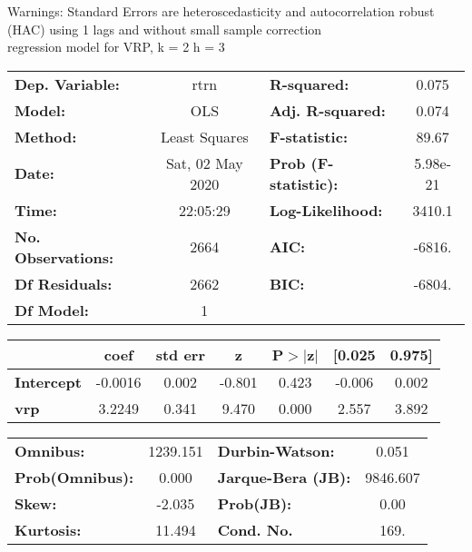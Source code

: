 Warnings: \newline
 [1] Standard Errors are heteroscedasticity and autocorrelation robust (HAC) using 1 lags and without small sample correction\\ 

regression model for VRP, k = 2 h = 3\begin{center}
\begin{tabular}{lclc}
\toprule
\textbf{Dep. Variable:}    &       rtrn       & \textbf{  R-squared:         } &     0.075   \\
\textbf{Model:}            &       OLS        & \textbf{  Adj. R-squared:    } &     0.074   \\
\textbf{Method:}           &  Least Squares   & \textbf{  F-statistic:       } &     89.67   \\
\textbf{Date:}             & Sat, 02 May 2020 & \textbf{  Prob (F-statistic):} &  5.98e-21   \\
\textbf{Time:}             &     22:05:29     & \textbf{  Log-Likelihood:    } &    3410.1   \\
\textbf{No. Observations:} &        2664      & \textbf{  AIC:               } &    -6816.   \\
\textbf{Df Residuals:}     &        2662      & \textbf{  BIC:               } &    -6804.   \\
\textbf{Df Model:}         &           1      & \textbf{                     } &             \\
\bottomrule
\end{tabular}
\begin{tabular}{lcccccc}
                   & \textbf{coef} & \textbf{std err} & \textbf{z} & \textbf{P$> |$z$|$} & \textbf{[0.025} & \textbf{0.975]}  \\
\midrule
\textbf{Intercept} &      -0.0016  &        0.002     &    -0.801  &         0.423        &       -0.006    &        0.002     \\
\textbf{vrp}       &       3.2249  &        0.341     &     9.470  &         0.000        &        2.557    &        3.892     \\
\bottomrule
\end{tabular}
\begin{tabular}{lclc}
\textbf{Omnibus:}       & 1239.151 & \textbf{  Durbin-Watson:     } &    0.051  \\
\textbf{Prob(Omnibus):} &   0.000  & \textbf{  Jarque-Bera (JB):  } & 9846.607  \\
\textbf{Skew:}          &  -2.035  & \textbf{  Prob(JB):          } &     0.00  \\
\textbf{Kurtosis:}      &  11.494  & \textbf{  Cond. No.          } &     169.  \\
\bottomrule
\end{tabular}
\end{center}

